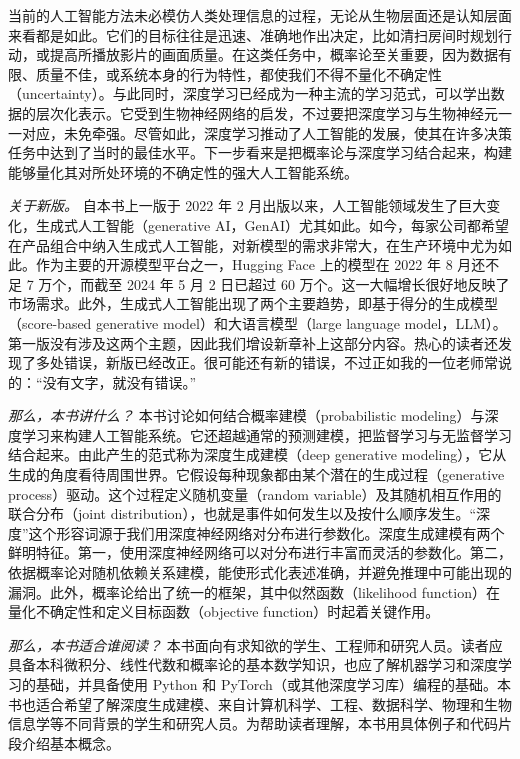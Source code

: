当前的人工智能方法未必模仿人类处理信息的过程，无论从生物层面还是认知层面来看都是如此。它们的目标往往是迅速、准确地作出决定，比如清扫房间时规划行动，或提高所播放影片的画面质量。在这类任务中，概率论至关重要，因为数据有限、质量不佳，或系统本身的行为特性，都使我们不得不量化不确定性（uncertainty）。与此同时，深度学习已经成为一种主流的学习范式，可以学出数据的层次化表示。它受到生物神经网络的启发，不过要把深度学习与生物神经元一一对应，未免牵强。尽管如此，深度学习推动了人工智能的发展，使其在许多决策任务中达到了当时的最佳水平。下一步看来是把概率论与深度学习结合起来，构建能够量化其对所处环境的不确定性的强大人工智能系统。

\emph{关于新版。} 自本书上一版于 2022 年 2 月出版以来，人工智能领域发生了巨大变化，生成式人工智能（generative AI，GenAI）尤其如此。如今，每家公司都希望在产品组合中纳入生成式人工智能，对新模型的需求非常大，在生产环境中尤为如此。作为主要的开源模型平台之一，Hugging Face 上的模型在 2022 年 8 月还不足 7 万个，而截至 2024 年 5 月 2 日已超过 60 万个。这一大幅增长很好地反映了市场需求。此外，生成式人工智能出现了两个主要趋势，即基于得分的生成模型（score-based generative model）和大语言模型（large language model，LLM）。第一版没有涉及这两个主题，因此我们增设新章补上这部分内容。热心的读者还发现了多处错误，新版已经改正。很可能还有新的错误，不过正如我的一位老师常说的：“没有文字，就没有错误。”

\emph{那么，本书讲什么？} 本书讨论如何结合概率建模（probabilistic modeling）与深度学习来构建人工智能系统。它还超越通常的预测建模，把监督学习与无监督学习结合起来。由此产生的范式称为深度生成建模（deep generative modeling），它从生成的角度看待周围世界。它假设每种现象都由某个潜在的生成过程（generative process）驱动。这个过程定义随机变量（random variable）及其随机相互作用的联合分布（joint distribution），也就是事件如何发生以及按什么顺序发生。“深度”这个形容词源于我们用深度神经网络对分布进行参数化。深度生成建模有两个鲜明特征。第一，使用深度神经网络可以对分布进行丰富而灵活的参数化。第二，依据概率论对随机依赖关系建模，能使形式化表述准确，并避免推理中可能出现的漏洞。此外，概率论给出了统一的框架，其中似然函数（likelihood function）在量化不确定性和定义目标函数（objective function）时起着关键作用。

\emph{那么，本书适合谁阅读？} 本书面向有求知欲的学生、工程师和研究人员。读者应具备本科微积分、线性代数和概率论的基本数学知识，也应了解机器学习和深度学习的基础，并具备使用 Python 和 PyTorch（或其他深度学习库）编程的基础。本书也适合希望了解深度生成建模、来自计算机科学、工程、数据科学、物理和生物信息学等不同背景的学生和研究人员。为帮助读者理解，本书用具体例子和代码片段介绍基本概念。

